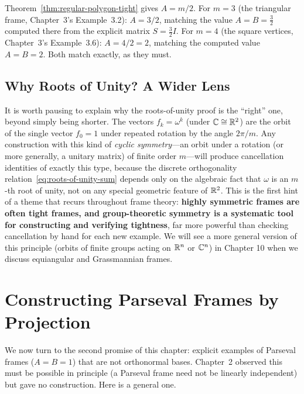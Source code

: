 \begin{examplebox}[title={Example 4.1: Checking the formula against Chapter 3}]
\label{ex:check-polygon-formula}
Theorem~\ref{thm:regular-polygon-tight} gives $A=m/2$. For $m=3$ (the
triangular frame, Chapter~3's Example~3.2): $A=3/2$, matching the value
$A=B=\tfrac32$ computed there from the explicit matrix $S=\tfrac32I$.
For $m=4$ (the square vertices, Chapter~3's Example~3.6): $A=4/2=2$,
matching the computed value $A=B=2$. Both match exactly, as they must.
\end{examplebox}

\subsection{Why Roots of Unity? A Wider Lens}
\label{subsec:why-roots-of-unity}

It is worth pausing to explain why the roots-of-unity proof is the
``right'' one, beyond simply being shorter. The vectors $f_k = \omega^k$
(under $\mathbb{C}\cong\mathbb{R}^2$) are the orbit of the single vector $f_0=1$ under
repeated rotation by the angle $2\pi/m$. Any construction with this kind
of \emph{cyclic symmetry}---an orbit under a rotation (or more generally,
a unitary matrix) of finite order $m$---will produce cancellation
identities of exactly this type, because the discrete orthogonality
relation~\eqref{eq:roots-of-unity-sum} depends only on the algebraic fact
that $\omega$ is an $m$-th root of unity, not on any special geometric
feature of $\mathbb{R}^2$. This is the first hint of a theme that recurs
throughout frame theory: \textbf{highly symmetric frames are often tight
frames, and group-theoretic symmetry is a systematic tool for
constructing and verifying tightness}, far more powerful than checking
cancellation by hand for each new example. We will see a more general
version of this principle (orbits of finite groups acting on $\mathbb{R}^n$ or
$\mathbb{C}^n$) in Chapter 10 when we discuss equiangular and Grassmannian frames.

\section{Constructing Parseval Frames by Projection}
\label{sec:parseval-from-projection}

We now turn to the second promise of this chapter: explicit examples of
Parseval frames ($A=B=1$) that are not orthonormal bases. Chapter~2
observed this must be possible in principle (a Parseval frame need not be
linearly independent) but gave no construction. Here is a general one.

